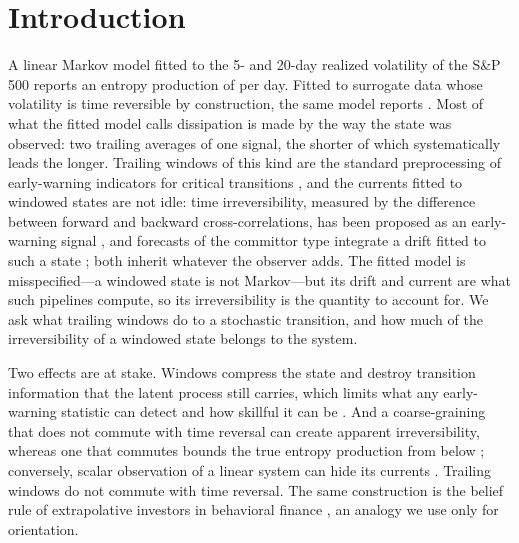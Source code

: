 \section{Introduction}\label{sec:intro}

A linear Markov model fitted to the 5- and 20-day realized volatility of the S\&P 500 reports an entropy production of \EpWinObs per day. Fitted to surrogate data whose volatility is time reversible by construction, the same model reports \EpWinSurMed. Most of what the fitted model calls dissipation is made by the way the state was observed: two trailing averages of one signal, the shorter of which systematically leads the longer. Trailing windows of this kind are the standard preprocessing of early-warning indicators for critical transitions \cite{scheffer2009,kuehn2011,dakos2012,lenton2012}, and the currents fitted to windowed states are not idle: time irreversibility, measured by the difference between forward and backward cross-correlations, has been proposed as an early-warning signal \cite{kooloth2026,xu2023}, and forecasts of the committor type integrate a drift fitted to such a state \cite{xing2026b}; both inherit whatever the observer adds. The fitted model is misspecified---a windowed state is not Markov---but its drift and current are what such pipelines compute, so its irreversibility is the quantity to account for. We ask what trailing windows do to a stochastic transition, and how much of the irreversibility of a windowed state belongs to the system.

Two effects are at stake. Windows compress the state and destroy transition information that the latent process still carries, which limits what any early-warning statistic can detect and how skillful it can be \cite{boettiger2012,ditlevsen2010,duplessis2026}. And a coarse-graining that does not commute with time reversal can create apparent irreversibility, whereas one that commutes bounds the true entropy production from below \cite{martinez2019,hartich2024,bisker2024,esposito2012}; conversely, scalar observation of a linear system can hide its currents \cite{lucente2022prr}. Trailing windows do not commute with time reversal. The same construction is the belief rule of extrapolative investors in behavioral finance \cite{bgjs2015}, an analogy we use only for orientation.

